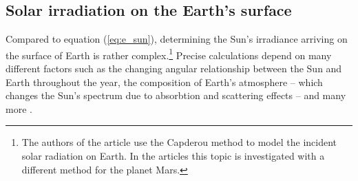 \subsection{Solar irradiation on the Earth's surface} \label{sec:solar_irradiation_on_earths_surface}
Compared to equation (\ref{eq:e_sun}), determining the Sun's irradiance arriving on the surface of Earth is rather complex.\footnote{The authors of the article \cite{Babikir:2020} use the Capderou method to model the incident solar radiation on Earth. In the articles\cite{Appelbaum:1990, Appelbaum:1992} this topic is investigated with a different method for the planet Mars.} Precise calculations depend on many different factors such as the changing angular relationship between the Sun and Earth throughout the year, the composition of Earth's atmosphere -- which changes the Sun's spectrum due to absorbtion and scattering effects -- and many more \cite{Landis:1995, Mertens:2015, Wagner:2018}. 

